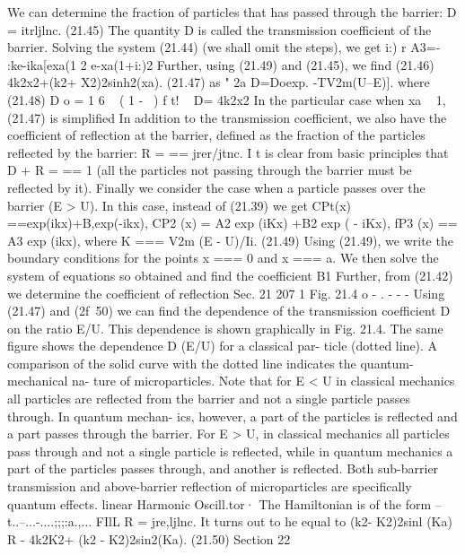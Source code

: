 \documentclass[a4paper,sfsidenotes,colorlinks=true]{tufte-book}
\numberwithin{equation}{section}
\numberwithin{figure}{section}
\begin{document}
{{{{We can determine the fraction of particles that has passed through the barrier:
D = itrljlnc.	(21.45)
The quantity D is called the transmission coefficient of the barrier. Solving the system (21.44) (we shall omit the steps), we get	i:)	r
A3=- :ke-ika[exa(1	2 e-xa(1+i:)2 Further, using (21.49) and (21.45), we find
(21.46) 4k2x2+(k2+ X2)2sinh2(xa).	(21.47)
as
" 2a D=Doexp. -TV2m(U--E)].
where
(21.48)
D o = 1 6 ~ ( 1 - ~)
f
t! ~
D=	4k2x2 In the particular case when xa ~ 1, (21.47) is simplified
In addition to the transmission coefficient, we also have the coefficient of reflection at the barrier, defined as the fraction of the particles reflected by the barrier: R =
== jrer/jtnc. I t is clear from basic principles that D + R = == 1 (all the particles not passing through the barrier
must be reflected by it). Finally we consider the case when a particle passes over the barrier (E > U). In this case, instead of (21.39) we get
CPt(x) ==exp(ikx)+B,exp(-ikx), CP2 (x) = A2 exp (iKx) +B2 exp ( - iKx), fP3 (x) == A3 exp (ikx), where K === V2m (E - U)/Ii.
(21.49)
Using (21.49), we write the boundary conditions for the points x === 0 and x === a. We then solve the system of equations so obtained and find the coefficient B1 Further, from (21.42) we determine the coefficient of reflection
Sec. 21	207
1
Fig. 21.4
o
-  . - - -
Using (21.47) and (2f~50) we can find the dependence of the transmission coefficient D on the ratio E/U. This dependence is shown graphically in Fig. 21.4. The same figure shows the dependence D (E/U) for a classical par- ticle (dotted line). A comparison of the solid curve with the dotted line indicates the quantum-mechanical na- ture of microparticles. Note that for E < U in classical mechanics all particles are reflected from the barrier and not a single particle passes through. In quantum mechan- ics, however, a part of the particles is reflected and a part passes through the barrier. For E > U, in classical mechanics all particles pass through and not a single
particle is reflected, while in quantum mechanics a part of the particles passes through, and another is reflected. Both sub-barrier transmission and above-barrier reflection of microparticles are specifically quantum effects.
linear Harmonic Oscill.tor·
The Hamiltonian is of the form
--t..--...-....;;;:a.,...
FIlL
R = jre,ljlnc. It turns out to he equal to 	(k2- K2)2sinl (Ka)
R - 4k2K2+ (k2 -	K2)2sin2(Ka).	(21.50)
Section
22
}}}}
\end{document}
